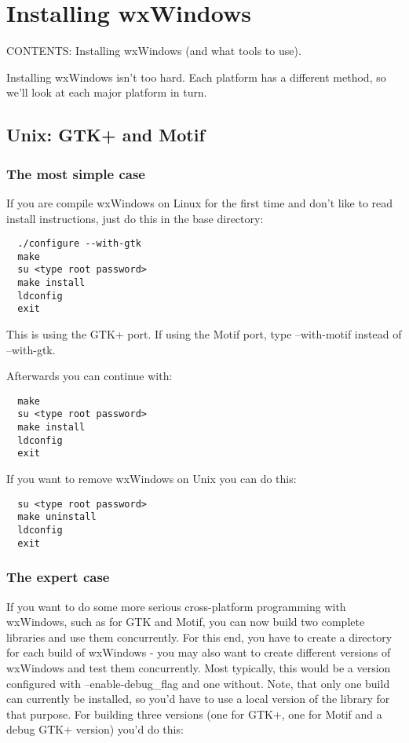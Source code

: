 \chapter{Installing wxWindows}\label{chapinstall}
%
%
\setfooter{\thepage}{}{}{}{}{\thepage}%

CONTENTS: Installing wxWindows (and what tools to use).

Installing wxWindows isn't too hard. Each platform has a different method, so we'll look
at each major platform in turn.

\section{Unix: GTK+ and Motif}\label{installunix}

\subsection{The most simple case}

If you are compile wxWindows on Linux for the first time and don't like to read 
install instructions, just do this in the base directory:

\begin{verbatim}
  ./configure --with-gtk
  make
  su <type root password>
  make install
  ldconfig
  exit
\end{verbatim}

This is using the GTK+ port. If using the Motif port, type --with-motif instead of --with-gtk.

Afterwards you can continue with:

\begin{verbatim}
  make
  su <type root password>
  make install
  ldconfig
  exit
\end{verbatim}

If you want to remove wxWindows on Unix you can do this:

\begin{verbatim}
  su <type root password>
  make uninstall
  ldconfig
  exit
\end{verbatim}

\subsection{The expert case}

If you want to do some more serious cross-platform programming with wxWindows, 
such as for GTK and Motif, you can now build two complete libraries and use 
them concurrently. For this end, you have to create a directory for each build 
of wxWindows - you may also want to create different versions of wxWindows
and test them concurrently. Most typically, this would be a version configured 
with --enable-debug\_flag and one without. Note, that only one build can currently 
be installed, so you'd have to use a local version of the library for that purpose.
For building three versions (one for GTK+, one for Motif and a debug GTK+ version) you'd do this:

